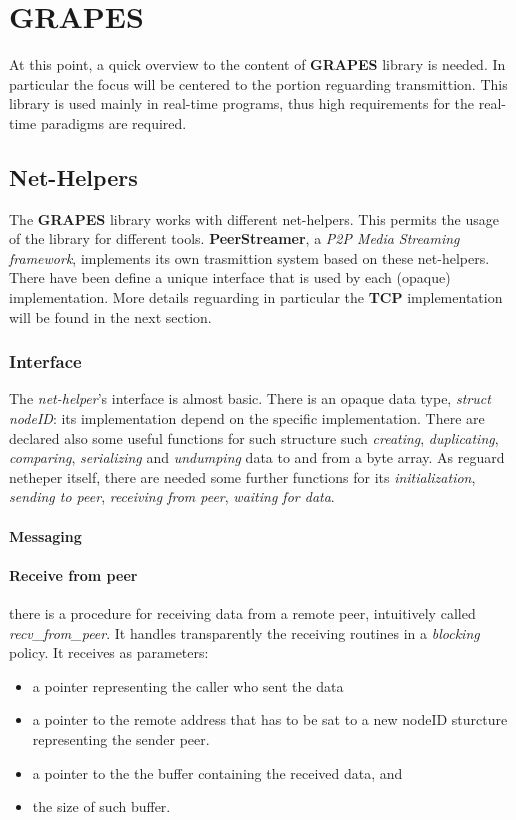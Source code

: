 \section{GRAPES}
\label{ch:grapes}
At this point, a quick overview to the content of \textbf{GRAPES} library is needed. In particular the focus
will be centered to the portion reguarding transmittion. This library is used mainly in real-time programs, thus
high requirements for the real-time paradigms are required.

\subsection{Net-Helpers}
The \textbf{GRAPES} library works with different net-helpers. This permits the usage of the library for different
tools. \textbf{PeerStreamer}, a \textit{P2P Media Streaming framework}, implements its own trasmittion system
based on these net-helpers. There have been define a unique interface that is used by each (opaque)
implementation. More details reguarding in particular the \textbf{TCP} implementation will be found in
the next section.

\subsubsection{Interface}
The \textit{net-helper}'s interface is almost basic. There is an opaque data type, \textit{struct nodeID}:
its implementation depend on the specific implementation. There are declared also some useful functions
for such structure such \textit{creating}, \textit{duplicating}, \textit{comparing}, \textit{serializing} and
\textit{undumping} data to and from a byte array.
As reguard netheper itself, there are needed some further functions for its \textit{initialization},
\textit{sending to peer}, \textit{receiving from peer}, \textit{waiting for data}.

\paragraph{Messaging} 


\paragraph{Receive from peer} there is a procedure for receiving data from a remote peer, intuitively called
\textit{recv\_from\_peer}. It handles transparently the receiving routines in a \textit{blocking} policy.
It receives as parameters:
\begin{itemize}
\item a pointer representing the caller who sent the data
\item a pointer to the remote address that has to be sat to a new nodeID sturcture representing the sender peer.
\item a pointer to the the buffer containing the received data, and
\item the size of such buffer.
\end{itemize}

